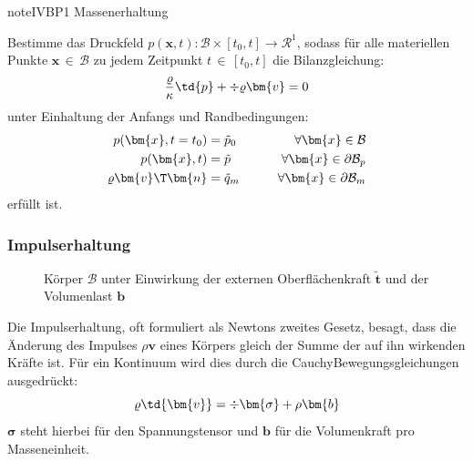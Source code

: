 \documentclass[letterpaper,10pt,german]{jupyterBook}
\let\sphinxpxdimen\pdfpxdimen\else\newdimen\sphinxpxdimen
\begin{document}
\begin{sphinxadmonition}{note}{IVBP1 \sphinxhyphen{} Massenerhaltung}

\sphinxAtStartPar
Bestimme das Druckfeld \(p(\bm{x},t): \mathcal{B} \times [t_0,t] \rightarrow \mathcal{R}^1\), sodass für alle materiellen Punkte \(\bm{x} \, \in \, \mathcal{B}\) zu jedem Zeitpunkt \(t \, \in \, [t_0,t]\) die Bilanzgleichung:
\begin{equation*}
\begin{split}
\frac{\varrho}{\kappa} \td{p} + \div{\varrho {\bm{v}}} = 0 
\end{split}
\end{equation*}
\sphinxAtStartPar
unter Einhaltung der Anfangs\sphinxhyphen{} und Randbedingungen:
\begin{equation*}
\begin{split}
p(\bm{x},t=t_0) & = \tilde{p}_0 \qquad &\forall \bm{x} \in \mathcal{B}& \\
p(\bm{x},t) & = \tilde{p} \qquad &\forall \bm{x} \in \partial \mathcal{B}_p& \\
\varrho \bm{v}\T \bm{n} & = \tilde{q}_m \qquad &\forall \bm{x} \in \partial\mathcal{B}_m&
\end{split}
\end{equation*}
\sphinxAtStartPar
erfüllt ist.
\end{sphinxadmonition}




\subsubsection{Impulserhaltung}
\label{\detokenize{chapters/chapter1/elasticity:impulserhaltung}}
\begin{figure}[htbp]
\centering
\capstart

\noindent\sphinxincludegraphics[height=200\sphinxpxdimen]{{Impulsbilanz}.jpg}
\caption{Körper \(\mathcal{B}\) unter Einwirkung der externen Oberflächenkraft \(\tilde{\bm{t}}\) und der Volumenlast \(\bm{b}\)}\label{\detokenize{chapters/chapter1/elasticity:impulsbilanz-fig-1}}\end{figure}

\sphinxAtStartPar
Die Impulserhaltung, oft formuliert als Newtons zweites Gesetz, besagt, dass die Änderung des Impulses \(\rho \bm{v}\) eines Körpers gleich der Summe der auf ihn wirkenden Kräfte ist. Für ein Kontinuum wird dies durch die Cauchy\sphinxhyphen{}Bewegungsgleichungen ausgedrückt:
\label{equation:chapters/chapter1/elasticity:5bb49630-2f3f-41b8-a872-91a3eb417682}\begin{equation}
 \varrho \td{\bm{v}} =\div{\bm{\sigma}} + \rho \bm{b}
\end{equation}
\sphinxAtStartPar
\(\boldsymbol{\sigma}\) steht hierbei für den Spannungstensor und \(\mathbf{b}\) für die Volumenkraft pro Masseneinheit.
\end{document}
